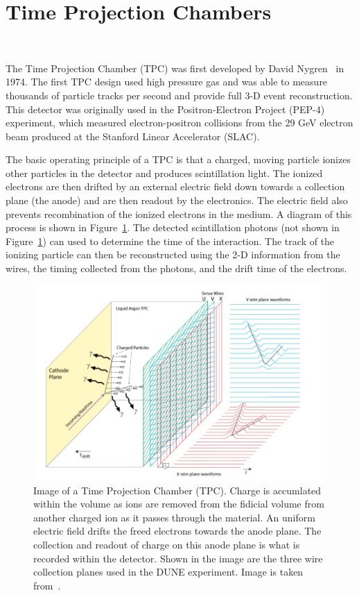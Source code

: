 \section{Time Projection Chambers}~\label{sec:tpcs}

The Time Projection Chamber (TPC) was first developed by David Nygren~\cite{lartpc:nygren} in 1974.
The first TPC design used high pressure gas and was able to measure thousands of particle tracks per second and provide full 3-D event reconstruction.
This detector was originally used in the Positron-Electron Project (PEP-4) experiment, which measured electron-positron collisions from the 29 GeV electron beam produced at the Stanford Linear Accelerator (SLAC).

The basic operating principle of a TPC is that a charged, moving particle ionizes other particles in the detector and produces scintillation light.
The ionized electrons are then drifted by an external electric field down towards a collection plane (the anode) and are then readout by the electronics.
The electric field also prevents recombination of the ionized electrons in the medium. 
A diagram of this process is shown in Figure~\ref{fig:dune_apa}.
The detected scintillation photons (not shown in Figure~\ref{fig:dune_apa}) can used to determine the time of the interaction.
The track of the ionizing particle can then be reconstructed using the 2-D information from the wires, the timing collected from the photons, and the drift time of the electrons.

\begin{figure}[]
\centering
\includegraphics[width=\textwidth]{images/dune_tdrv12020_lartpc-sp.jpg}
\caption{Image of a Time Projection Chamber (TPC).
Charge is accumlated within the volume as ions are removed from the fidicial volume from another charged ion as it passes through the material.
An uniform electric field drifts the freed electrons towards the anode plane.
The collection and readout of charge on this anode plane is what is recorded within the detector.
Shown in the image are the three wire collection planes used in the DUNE experiment.
Image is taken from~\citep{DUNE_TDR_V1_Abi_2020}.}
\label{fig:dune_apa}
\end{figure}

